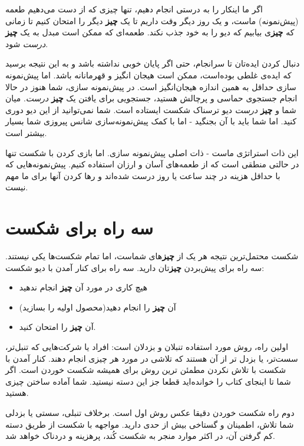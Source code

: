 اگر ما اینکار را به درستی انجام دهیم، تنها چیزی که از دست می‌دهیم طعمه
(پیش‌نمونه) ماست، و یک روز دیگر وقت داریم تا یک \textbf{چیز} دیگر را
امتحان کنیم تا زمانی که \textbf{چیز}ی بیابیم که دیو را به خود جذب نکند.
طعمه‌ای که ممکن است مبدل به یک \textbf{چیز} \emph{درست} شود.

دنبال کردن ایده‌تان تا سرانجام، حتی اگر پایان خوبی نداشته باشد و به این
نتیجه برسید که ایده‌ی غلطی بوده‌است، ممکن است هیجان انگیز و قهرمانانه
باشد. اما پیش‌نمونه سازی حداقل به همین اندازه هیجان‌انگیز است. در
پیش‌نمونه سازی، شما هنوز در حالا انجام جستجوی حماسی و پرچالش هستید،
جستجویی برای یافتن یک \textbf{چیز} \emph{درست}. میان شما و \textbf{چیز}
\emph{درست} دیو ترسناک شکست ایستاده است. شما نمی‌توانید از این دیو دوری
کنید. اما شما باید با آن بجنگید - اما با کمک پیش‌نمونه‌سازی شانس پیروزی
شما بسیار بیشتر است.

این ذات استراتژی ماست - ذات اصلی پیش‌نمونه سازی. اما بازی کردن با شکست
تنها در حالتی منطقی است که از طعمه‌های آسان و ارزان استفاده کنیم.
پیش‌نمونه‌هایی که با حداقل هزینه در چند ساعت یا روز درست شده‌اند و رها
کردن آنها برای ما مهم نیست.

\section{سه راه برای
شکست}\label{ux633ux647-ux631ux627ux647-ux628ux631ux627ux6cc-ux634ux6a9ux633ux62a}

شکست محتمل‌ترین نتیجه هر یک از \textbf{چیز}های شماست، اما تمام شکست‌ها
یکی نیستند. سه راه برای پیش‌بردن \textbf{چیز}تان دارید. سه راه برای کنار
آمدن با دیو شکست:

\begin{itemize}

\item
  هیچ کاری در مورد آن \textbf{چیز} انجام ندهید
\item
  آن \textbf{چیز} را انجام دهید(محصول اولیه را بسازید)
\item
  آن \textbf{چیز} را امتحان کنید.
\end{itemize}

اولین راه، روش مورد استفاده تنبلان و بزدلان است: افراد یا شرکت‌هایی که
تنبل‌تر، سست‌تر، یا بزدل تر از آن هستند که تلاشی در مورد هر چیزی انجام
دهند. کنار آمدن با شکست با تلاش نکردن مطمئن ترین روش برای همیشه شکست
خوردن است. اگر شما تا اینجای کتاب را خوانده‌اید قطعا جز این دسته نیستید.
شما آماده ساختن چیزی هستید.

دوم راه شکست خوردن دقیقا عکس روش اول است. برخلاف تنبلی، سستی یا بزدلی
شما تلاش، اطمینان و گستاخی بیش از حدی دارید. مواجهه با شکست از طریق دسته
کم گرفتن آن، در اکثر موارد منجر به شکست کُند، پرهزینه و دردناک خواهد شد.

